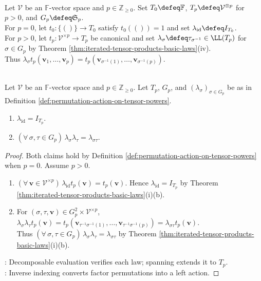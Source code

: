 \begin{definition} \label{def:permutation-action-on-tensor-powers} \\
Let $\mathcal{V}$ be an $\mathbb{F}$-vector space and $p\in\mathbb{Z}_{\geq0}$. Set $T_0\defeq\mathbb{F}$, $T_p\defeq\mathcal{V}^{\otimes p}$ for $p>0$, and $G_p\defeq\mathfrak{S}_p$.\\
For $p=0$, let $t_0:\{()\}\to T_0$ satisfy $t_0(())=1$ and set $\lambda_{\operatorname{id}}\defeq I_{T_0}$.\\
For $p>0$, let $t_p:\mathcal{V}^{\times p}\to T_p$ be canonical and set $\lambda_{\sigma}\defeq\tau_{\sigma^{-1}}\in\LL(T_p)$ for $\sigma\in G_p$ by Theorem \ref{thm:iterated-tensor-products-basic-laws}(iv).\\
Thus $\lambda_{\sigma}t_p(\mathbf{v}_1,\ldots,\mathbf{v}_p)=t_p(\mathbf{v}_{\sigma^{-1}(1)},\ldots,\mathbf{v}_{\sigma^{-1}(p)})$.
\end{definition}

\begin{proposition} \label{prop:permutation-representation-on-tensor-powers} \\
Let $\mathcal{V}$ be an $\mathbb{F}$-vector space and $p\in\mathbb{Z}_{\geq0}$. Let $T_p$, $G_p$, and $(\lambda_{\sigma})_{\sigma\in G_p}$ be as in Definition \ref{def:permutation-action-on-tensor-powers}.
\begin{enumerate}[label=(\roman*)]
\setlength{\itemsep}{0pt}
\item $\lambda_{\operatorname{id}}=I_{T_p}$.
\item $(\forall\,\sigma,\tau\in G_p)\,\lambda_{\sigma}\lambda_{\tau}=\lambda_{\sigma\tau}$.
\end{enumerate}
\begin{proof}
Both claims hold by Definition \ref{def:permutation-action-on-tensor-powers} when $p=0$. Assume $p>0$.
\begin{enumerate}[label=(\roman*)]
\setlength{\itemsep}{0pt}
\item $(\forall\,\mathbf{v}\in\mathcal{V}^{\times p})\,\lambda_{\operatorname{id}}t_p(\mathbf{v})=t_p(\mathbf{v})$. Hence $\lambda_{\operatorname{id}}=I_{T_p}$ by Theorem \ref{thm:iterated-tensor-products-basic-laws}(i)(b).
\item For $(\sigma,\tau,\mathbf{v})\in G_p^2\times\mathcal{V}^{\times p}$, $\lambda_{\sigma}\lambda_{\tau}t_p(\mathbf{v})=t_p(\mathbf{v}_{\tau^{-1}\sigma^{-1}(1)},\ldots,\mathbf{v}_{\tau^{-1}\sigma^{-1}(p)})=\lambda_{\sigma\tau}t_p(\mathbf{v})$.\\
Thus $(\forall\,\sigma,\tau\in G_p)\,\lambda_{\sigma}\lambda_{\tau}=\lambda_{\sigma\tau}$ by Theorem \ref{thm:iterated-tensor-products-basic-laws}(i)(b).
\end{enumerate}
: Decomposable evaluation verifies each law; spanning extends it to $T_p$.\\
: Inverse indexing converts factor permutations into a left action.
\end{proof}
\end{proposition}

